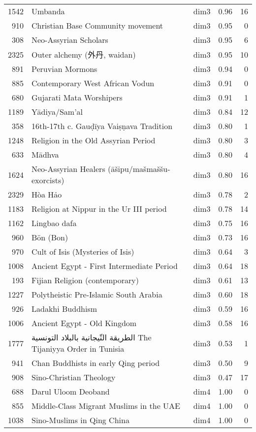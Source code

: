 \begin{tabular}{rllrr}
1542 & Umbanda & dim3 & 0.96 & 16 \\
910 & Christian Base Community movement & dim3 & 0.95 & 0 \\
308 & Neo-Assyrian Scholars & dim3 & 0.95 & 6 \\
2325 & Outer alchemy (外丹, waidan) & dim3 & 0.95 & 10 \\
891 & Peruvian Mormons & dim3 & 0.94 & 0 \\
885 & Contemporary West African Vodun & dim3 & 0.91 & 0 \\
680 & Gujarati Mata Worshipers & dim3 & 0.91 & 1 \\
1189 & Yādiya/Sam'al & dim3 & 0.84 & 12 \\
358 & 16th-17th c. Gauḍīya Vaiṣṇava Tradition & dim3 & 0.80 & 1 \\
1248 & Religion in the Old Assyrian Period & dim3 & 0.80 & 3 \\
633 & Mādhva & dim3 & 0.80 & 4 \\
1624 & Neo-Assyrian Healers (āšipu/mašmaššu-exorcists) & dim3 & 0.80 & 16 \\
2329 & Hòa Hảo & dim3 & 0.78 & 2 \\
1183 & Religion at Nippur in the Ur III period & dim3 & 0.78 & 14 \\
1162 & Lingbao dafa & dim3 & 0.75 & 16 \\
960 & Bön (Bon) & dim3 & 0.73 & 16 \\
970 & Cult of Isis (Mysteries of Isis) & dim3 & 0.64 & 3 \\
1008 & Ancient Egypt - First Intermediate Period & dim3 & 0.64 & 18 \\
193 & Fijian Religion (contemporary) & dim3 & 0.61 & 13 \\
1227 & Polytheistic Pre-Islamic South Arabia & dim3 & 0.60 & 18 \\
926 & Ladakhi Buddhism & dim3 & 0.59 & 16 \\
1006 & Ancient Egypt - Old Kingdom & dim3 & 0.58 & 16 \\
1777 & الطريقة التّيجانية بالبلاد التونسية The Tijaniyya Order in Tunisia & dim3 & 0.53 & 1 \\
941 & Chan Buddhists in early Qing period & dim3 & 0.50 & 9 \\
908 & Sino-Christian Theology & dim3 & 0.47 & 17 \\
688 & Darul Uloom Deoband & dim4 & 1.00 & 0 \\
855 & Middle-Class Migrant Muslims in the UAE & dim4 & 1.00 & 0 \\
1038 & Sino-Muslims in Qing China & dim4 & 1.00 & 0 \\

\end{tabular}
